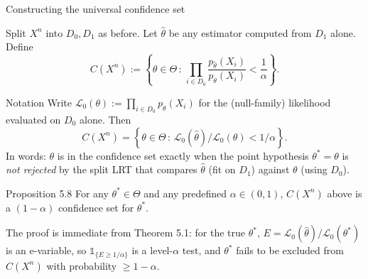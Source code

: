 \documentclass[aspectratio=169,10pt]{beamer}
\begin{document}
\begin{frame}[allowframebreaks]{Constructing the universal confidence set}

  Split $X^n$ into $D_0, D_1$ as before. Let $\hat\theta$ be any
  estimator computed from $D_1$ alone. Define
  $$ C(X^n) := \left\{\theta \in \Theta \,:\, \prod_{i\in D_0} \frac{p_{\hat\theta}(X_i)}{p_\theta(X_i)} < \frac1\alpha \right\}. $$

  \begin{block}{Notation}
    Write $\mathcal{L}_0(\theta) := \prod_{i \in D_0} p_\theta(X_i)$ for
    the (null-family) likelihood evaluated on $D_0$ alone. Then
    $$ C(X^n) = \left\{\theta \in \Theta \,:\, \mathcal{L}_0(\hat\theta)/\mathcal{L}_0(\theta) < 1/\alpha\right\}. $$
    In words: $\theta$ is in the confidence set exactly when the point
    hypothesis $\theta^*=\theta$ is \emph{not rejected} by the split LRT
    that compares $\hat\theta$ (fit on $D_1$) against $\theta$ (using
    $D_0$).
  \end{block}

  \begin{alertblock}{Proposition 5.8}
    For any $\theta^* \in \Theta$ and any predefined $\alpha \in (0,1)$,
    $C(X^n)$ above is a $(1-\alpha)$ confidence set for $\theta^*$.
  \end{alertblock}

  The proof is immediate from Theorem 5.1: for the true $\theta^*$,
  $E = \mathcal{L}_0(\hat\theta)/\mathcal{L}_0(\theta^*)$ is an
  e-variable, so $\mathbb 1_{\{E \ge 1/\alpha\}}$ is a level-$\alpha$
  test, and $\theta^*$ fails to be excluded from $C(X^n)$ with
  probability $\ge 1-\alpha$.

\end{frame}
\end{document}
